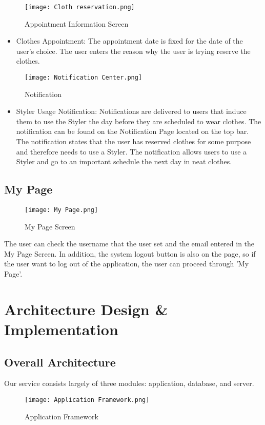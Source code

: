 \documentclass[conference]{IEEEtran}
\begin{document}
\begin{figure}[htbp]
\centerline{\texttt{[image: Cloth reservation.png]}}
\label{fig}
\caption{Appointment Information Screen}
\end{figure}
\begin{itemize}
    \item Clothes Appointment: The appointment date is fixed for the date of the user’s choice. The user enters the reason why the user is trying reserve the clothes.\\
\end{itemize}
    
\begin{figure}[htbp]
\centerline{\texttt{[image: Notification Center.png]}}
\label{fig}
\caption{Notification}
\end{figure}
\begin{itemize}
    \item Styler Usage Notification: Notifications are delivered to users that induce them to use the Styler the day before they are scheduled to wear clothes. The notification can be found on the Notification Page located on the top bar. The notification states that the user has reserved clothes for some purpose and therefore needs to use a Styler. The notification allows users to use a Styler and go to an important schedule the next day in neat clothes.\\
\end{itemize}

\subsection{My Page}
\begin{figure}[htbp]
\centerline{\texttt{[image: My Page.png]}}
\label{fig}
\caption{My Page Screen}
\end{figure}
The user can check the username that the user set and the email entered in the My Page Screen. In addition, the system logout button is also on the page, so if the user want to log out of the application, the user can proceed through 'My Page'.\\


\section{Architecture Design & Implementation}
\subsection{Overall Architecture}
Our service consists largely of three modules: application, database, and server.
\begin{figure}[htbp]
\centerline{\texttt{[image: Application Framework.png]}}
\label{fig}
\caption{Application Framework}
\end{figure}
\end{document}
